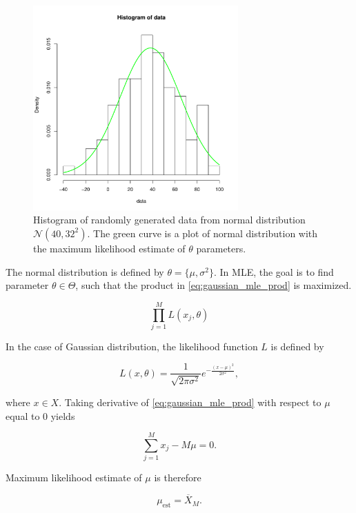 \documentclass[thesis=B,english]{FITthesis}[2012/06/26]
\begin{document}
\begin{figure}
	\centering
 	\includegraphics[width=0.7\textwidth]{normal_mle}
 	\caption{Histogram of randomly generated data from normal distribution $\mathcal{N}(40,32^2)$. The green curve is a plot of normal distribution with the maximum likelihood estimate of $\theta$ parameters.}
 	\label{fig:normal_mle}
\end{figure}

The normal distribution is defined by $\theta = \{\mu, \sigma^2\}$. In MLE, the goal is to find parameter $\theta \in \Theta$, such that the product in \ref{eq:gaussian_mle_prod} is maximized.

\begin{equation} \label{eq:gaussian_mle_prod}
\prod_{j=1}^{M} L(x_j, \theta)
\end{equation}

In the case of Gaussian distribution, the likelihood function $L$ is defined by

\begin{equation*}
L(x, \theta) = \frac{1}{\sqrt{2 \pi \sigma^2}}e^{-\frac{(x-\mu)^2}{2 \sigma^2}},
\end{equation*}

\medskip
where $x \in X$. Taking derivative of \ref{eq:gaussian_mle_prod} with respect to $\mu$ equal to 0 yields

\begin{equation*}
\sum_{j=1}^{M}{x_j - M \mu} = 0.
\end{equation*}

\bigskip
Maximum likelihood estimate of $\mu$ is therefore

\begin{equation*}
\mu_{\text{est}} = \overline X_M.
\end{equation*}
\end{document}
